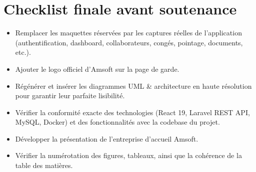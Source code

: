 \documentclass[12pt,a4paper]{report}
\begin{document}
\chapter{Checklist finale avant soutenance}

\begin{itemize}
    \item[\checkmark] Remplacer les maquettes réservées par les captures réelles de l'application (authentification, dashboard, collaborateurs, congés, pointage, documents, etc.).
    \item[\checkmark] Ajouter le logo officiel d'Amsoft sur la page de garde.
    \item[\checkmark] Régénérer et insérer les diagrammes UML \& architecture en haute résolution pour garantir leur parfaite lisibilité.
    \item[\checkmark] Vérifier la conformité exacte des technologies (React 19, Laravel REST API, MySQL, Docker) et des fonctionnalités avec la codebase du projet.
    \item[\checkmark] Développer la présentation de l'entreprise d'accueil Amsoft.
    \item[\checkmark] Vérifier la numérotation des figures, tableaux, ainsi que la cohérence de la table des matières.
\end{itemize}
\end{document}
